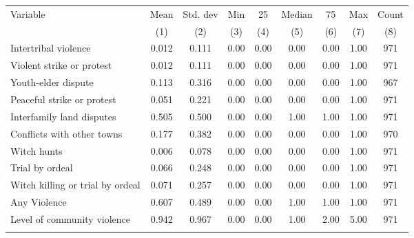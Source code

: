 \begin{tabular}{lcccccccc}
\hline \noalign{\smallskip}Variable & Mean & Std. dev & Min & 25 & Median & 75 & Max & Count\\
 & (1) & (2) & (3) & (4) & (5) & (6) & (7) & (8)\\
\noalign{\smallskip}\hline \noalign{\smallskip}\quad Intertribal violence & 0.012 & 0.111 & 0.00 & 0.00 & 0.00 & 0.00 & 1.00 & 971\\
\quad Violent strike or protest & 0.012 & 0.111 & 0.00 & 0.00 & 0.00 & 0.00 & 1.00 & 971\\
\quad Youth-elder dispute & 0.113 & 0.316 & 0.00 & 0.00 & 0.00 & 0.00 & 1.00 & 967\\
\quad Peaceful strike or protest & 0.051 & 0.221 & 0.00 & 0.00 & 0.00 & 0.00 & 1.00 & 971\\
\quad Interfamily land disputes & 0.505 & 0.500 & 0.00 & 0.00 & 1.00 & 1.00 & 1.00 & 971\\
\quad Conflicts with other towns & 0.177 & 0.382 & 0.00 & 0.00 & 0.00 & 0.00 & 1.00 & 970\\
\quad Witch hunts & 0.006 & 0.078 & 0.00 & 0.00 & 0.00 & 0.00 & 1.00 & 971\\
\quad Trial by ordeal & 0.066 & 0.248 & 0.00 & 0.00 & 0.00 & 0.00 & 1.00 & 971\\
Witch killing or trial by ordeal & 0.071 & 0.257 & 0.00 & 0.00 & 0.00 & 0.00 & 1.00 & 971\\
Any Violence & 0.607 & 0.489 & 0.00 & 0.00 & 1.00 & 1.00 & 1.00 & 971\\
Level of community violence & 0.942 & 0.967 & 0.00 & 0.00 & 1.00 & 2.00 & 5.00 & 971\\
\noalign{\smallskip}\hline\end{tabular}
